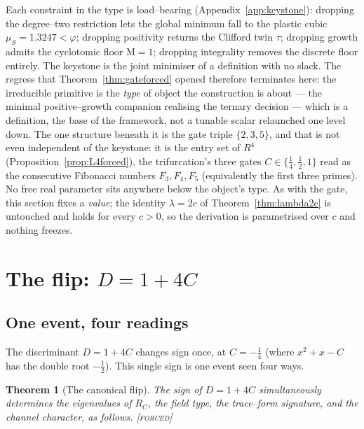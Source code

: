 \documentclass[11pt]{article}
\theoremstyle{plain}
\newtheorem{theorem}{Theorem}[section]
\theoremstyle{definition}
\theoremstyle{remark}
\newcommand{\forced}{\textcolor{forcedc}{\textsc{[forced]}}}
\newcommand{\Mah}{\mathrm{M}}
\begin{document}
Each constraint in the type is load--bearing (Appendix~\ref{app:keystone}): dropping the degree--two restriction lets the global minimum fall to the plastic cubic $\mu_S=1.3247<\varphi$; dropping positivity returns the Clifford twin $\tau$; dropping growth admits the cyclotomic floor $\Mah=1$; dropping integrality removes the discrete floor entirely. The keystone is the joint minimiser of a definition with no slack. The regress that Theorem~\ref{thm:gateforced} opened therefore terminates here: the irreducible primitive is the \emph{type} of object the construction is about --- the minimal positive--growth companion realising the ternary decision --- which is a definition, the base of the framework, not a tunable scalar relaunched one level down. The one structure beneath it is the gate triple $\{2,3,5\}$, and that is not even independent of the keystone: it is the entry set of $R^4$ (Proposition~\ref{prop:L4forced}), the trifurcation's three gates $C\in\{\tfrac14,\tfrac12,1\}$ read as the consecutive Fibonacci numbers $F_3,F_4,F_5$ (equivalently the first three primes). No free real parameter sits anywhere below the object's type. As with the gate, this section fixes a \emph{value}; the identity $\lambda=2c$ of Theorem~\ref{thm:lambda2c} is untouched and holds for every $c>0$, so the derivation is parametrised over $c$ and nothing freezes.

\section{The flip: \texorpdfstring{$D=1+4C$}{D = 1 + 4C}}\label{sec:flip}

\subsection{One event, four readings}

The discriminant $D=1+4C$ changes sign once, at $C=-\tfrac14$ (where $x^2+x-C$ has the double root $-\tfrac12$). This single sign is one event seen four ways.

\begin{theorem}[The canonical flip]\label{thm:flip}
The sign of $D=1+4C$ simultaneously determines the eigenvalues of $R_C$, the field type, the trace--form signature, and the channel character, as follows. \forced
\end{theorem}
\end{document}
